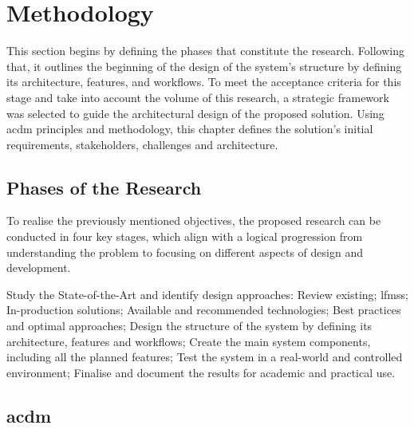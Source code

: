 \chapter{Methodology}
\label{chapter:methodology}

This section begins by defining the phases that constitute the research. Following that, it outlines the beginning of the design of the system's structure by defining its architecture, features, and workflows. To meet the acceptance criteria for this stage and take into account the volume of this research, a strategic framework was selected to guide the architectural design of the proposed solution. Using \ac{acdm} principles and methodology, this chapter defines the solution's initial requirements, stakeholders, challenges and architecture.


\section{Phases of the Research} \label{section:phases_of_the_research}

To realise the previously mentioned objectives, the proposed research can be conducted in four key stages, which align with a logical progression from understanding the problem to focusing on different aspects of design and development.

\begin{outline}[enumerate]
    \1 Study the State-of-the-Art and identify design approaches:
        \2 Review existing;
        \2 \aclp{lfms};
        \2 In-production solutions;
        \2 Available and recommended technologies;
        \2 Best practices and optimal approaches;
    \1 Design the structure of the system by defining its architecture, features and workflows;
    \1 Create the main system components, including all the planned features;
    \1 Test the system in a real-world and controlled environment;
    \1 Finalise and document the results for academic and practical use.
\end{outline}


\section{\acl{acdm}} \label{section:acdm}

